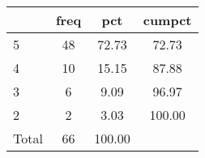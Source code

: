 {
\def\sym#1{\ifmmode^{#1}\else\(^{#1}\)\fi}
\begin{tabular}{l*{1}{ccc}}
\hline\hline
            &        freq&         pct&      cumpct\\
\hline
5           &          48&       72.73&       72.73\\
4           &          10&       15.15&       87.88\\
3           &           6&        9.09&       96.97\\
2           &           2&        3.03&      100.00\\
Total       &          66&      100.00&            \\
\hline\hline
\end{tabular}
}
